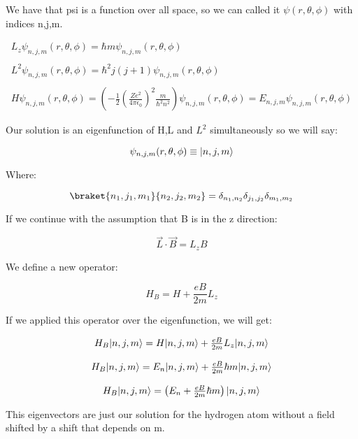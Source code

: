 We have that psi is a function over all space, so we can called it $\psi(r,\theta,\phi)$ with indices n,j,m.

\begin{equation}
  \begin{array}{c}
    L_z \psi_{n,j,m}(r,\theta,\phi) = \hbar m \psi_{n,j,m}(r,\theta,\phi)
    \\

    \\
    L^2 \psi_{n,j,m}(r,\theta,\phi) = \hbar^2 j(j+1) \psi_{n,j,m}(r,\theta,\phi)
    \\

    \\
    H \psi_{n,j,m}(r,\theta,\phi) = \left(-\frac{1}{2}\left(\frac{Ze^2}{4\pi\epsilon_0}\right)^2\frac{m}{\hbar^2 n^2}\right)\psi_{n,j,m}(r,\theta,\phi) = E_{n,j,m} \psi_{n,j,m}(r,\theta,\phi)
  \end{array}
\end{equation}

Our solution is an eigenfunction of H,L and $L^2$ simultaneously so we will say:

\begin{equation}
  \psi_{n,j,m}(r,\theta,\phi) \equiv \lvert n,j,m\rangle
\end{equation}

Where:

\begin{equation}
  \braket{n_1,j_1,m_1}{n_2,j_2,m_2} = \delta_{n_1,n_2}\delta_{j_1,j_2}\delta_{m_1,m_2}
\end{equation}

If we continue with the assumption that B is in the z direction:

\begin{equation}
  \vec{L}\cdot\vec{B} = L_z B
\end{equation}

We define a new operator:

\begin{equation}
  H_B = H + \frac{eB}{2m} L_z
\end{equation}

If we applied this operator over the eigenfunction, we will get:

\begin{equation}
  \begin{array}{c}
    H_B \lvert n,j,m\rangle = H\lvert n,j,m\rangle + \frac{eB}{2m} L_z \lvert n,j,m\rangle
    \\

    \\
    H_B \lvert n,j,m\rangle = E_n \lvert n,j,m\rangle + \frac{eB}{2m} \hbar m \lvert n,j,m\rangle
    \\

    \\
    H_B \lvert n,j,m\rangle = \left(E_n + \frac{eB}{2m} \hbar m\right) \lvert n,j,m\rangle
  \end{array}
\end{equation}

This eigenvectors are just our solution for the hydrogen atom without a field shifted by a shift that depends on m.



